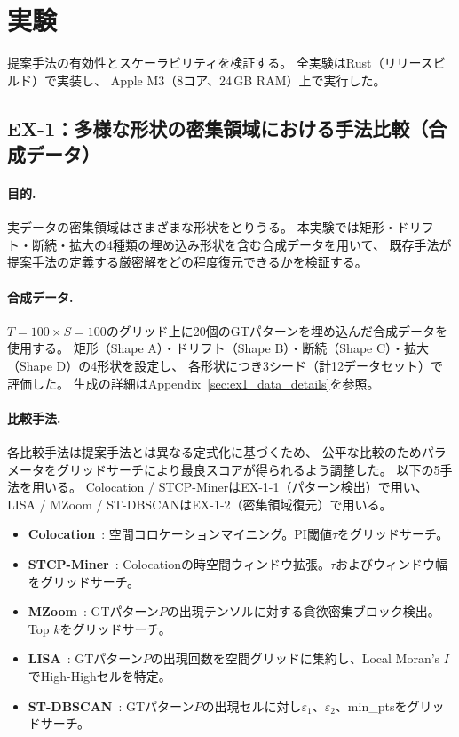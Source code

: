 \section{実験}\label{sec:experiments}

提案手法の有効性とスケーラビリティを検証する。
全実験はRust（リリースビルド）で実装し、
Apple M3（8コア、24\,GB RAM）上で実行した。

\subsection{EX-1：多様な形状の密集領域における手法比較（合成データ）}
\label{sec:ex1}\label{sec:ex1_1}

\paragraph{目的.}
実データの密集領域はさまざまな形状をとりうる。
本実験では矩形・ドリフト・断続・拡大の4種類の埋め込み形状を含む合成データを用いて、
既存手法が提案手法の定義する厳密解をどの程度復元できるかを検証する。

\paragraph{合成データ.}
$T{=}100 \times S{=}100$のグリッド上に20個のGTパターンを埋め込んだ合成データを使用する。
矩形（Shape A）・ドリフト（Shape B）・断続（Shape C）・拡大（Shape D）の4形状を設定し、
各形状につき3シード（計12データセット）で評価した。
生成の詳細はAppendix~\ref{sec:ex1_data_details}を参照。

\paragraph{比較手法.}
各比較手法は提案手法とは異なる定式化に基づくため、
公平な比較のためパラメータをグリッドサーチにより最良スコアが得られるよう調整した。
以下の5手法を用いる。
Colocation / STCP-MinerはEX-1-1（パターン検出）で用い、
LISA / MZoom / ST-DBSCANはEX-1-2（密集領域復元）で用いる。

\begin{itemize}
\item \textbf{Colocation}~\cite{shekhar2001colocation}: 空間コロケーションマイニング。PI閾値$\tau$をグリッドサーチ。
\item \textbf{STCP-Miner}~\cite{qian2009stcolocation}: Colocationの時空間ウィンドウ拡張。$\tau$およびウィンドウ幅をグリッドサーチ。
\item \textbf{MZoom}~\cite{shin2018mzoom}: GTパターン$P$の出現テンソルに対する貪欲密集ブロック検出。Top $k$をグリッドサーチ。
\item \textbf{LISA}~\cite{anselin1995lisa}: GTパターン$P$の出現回数を空間グリッドに集約し、Local Moran's $I$でHigh-Highセルを特定。
\item \textbf{ST-DBSCAN}~\cite{birant2007stdbscan}: GTパターン$P$の出現セルに対し$\varepsilon_1$、$\varepsilon_2$、min\_ptsをグリッドサーチ。
\end{itemize}

